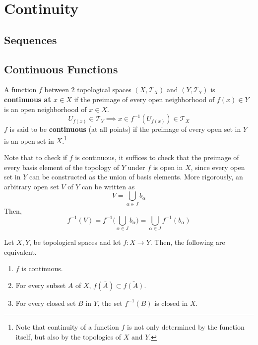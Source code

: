 \section{Continuity} 

  \subsection{Sequences}

  \subsection{Continuous Functions}

    \begin{definition}
      A function $f$ between 2 topological spaces $(X, \mathscr{T}_{X})$ and $(Y, \mathscr{T}_{Y})$ is \textbf{continuous at $x \in X$} if the preimage of every open neighborhood of $f(x) \in Y$ is an open neighborhood of $x \in X$.
      \begin{equation}
        U_{f(x)} \in \mathscr{T}_{Y} \implies x \in f^{-1}(U_{f(x)}) \in \mathscr{T}_{X}
      \end{equation} 
      $f$ is said to be \textbf{continuous} (at all points) if the preimage of every open set in $Y$ is an open set in $X$.\footnote{Note that continuity of a function $f$ is not only determined by the function itself, but also by the topologies of $X$ and $Y$.}
    \end{definition}

    Note that to check if $f$ is continuous, it suffices to check that the preimage of every basis element of the topology of $Y$ under $f$ is open in $X$, since every open set in $Y$ can be constructed as the union of basis elements. More rigorously, an arbitrary open set $V$ of $Y$ can be written as 
    \begin{equation}
      V = \bigcup_{\alpha \in J} b_\alpha
    \end{equation}
    Then, 
    \begin{equation}
      f^{-1} (V) = f^{-1} \Big( \bigcup_{\alpha \in J} b_\alpha \Big) = \bigcup_{\alpha \in J} f^{-1} (b_\alpha)
    \end{equation}

    \begin{theorem}
      Let $X, Y$, be topological spaces and let $f: X \longrightarrow Y$. Then, the following are equivalent. 
      \begin{enumerate}
        \item $f$ is continuous. 
        \item For every subset $A$ of $X$, $f(\bar{A}) \subset \bar{f(A)}$. 
        \item For every closed set $B$ in $Y$, the set $f^{-1} (B)$ is closed in $X$. 
      \end{enumerate}
    \end{theorem}  

